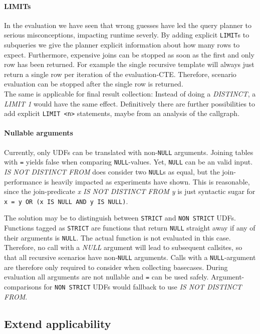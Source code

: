 \paragraph*{LIMITs}
In the evaluation we have seen that wrong guesses have led the query planner to serious misconceptions, impacting runtime severly. By adding explicit \texttt{LIMIT}s to subqueries we give the planner explicit information about how many rows to expect. Furthermore, expensive joins can be stopped as soon as the first and only row has been returned. For example the single recursive template will always just return a single row per iteration of the evaluation-CTE. Therefore, scenario evaluation can be stopped after the single row is returned.\\
The same is applicable for final result collection: Instead of doing a \textit{DISTINCT}, a \textit{LIMIT 1} would have the same effect. Definitively there are further possibilities to add explicit \texttt{LIMIT <n>} statements, maybe from an analysis of the callgraph.

\paragraph*{Nullable arguments}
Currently, only UDFs can be translated with non-\texttt{NULL} arguments. Joining tables with \texttt{=} yields false when comparing \texttt{NULL}-values. Yet, \texttt{NULL} can be an valid input. \textit{IS NOT DISTINCT FROM} does consider two \texttt{NULL}s as equal, but the join-performance is heavily impacted as experiments have shown. This is reasonable, since the join-predicate \textit{x IS NOT DISTINCT FROM y} is just syntactic sugar for \texttt{x = y OR (x IS NULL AND y IS NULL)}.

The solution may be to distinguish between \texttt{STRICT} and \texttt{NON STRICT} UDFs. Functions tagged as \texttt{STRICT} are functions that return \texttt{NULL} straight away if any of their arguments is \texttt{NULL}. The actual function is not evaluated in this case. Therefore, no call with a \textit{NULL} argument will lead to subsequent callsites, so that all recursive scenarios have non-\texttt{NULL} arguments. Calls with a \texttt{NULL}-argument are therefore only required to consider when collecting basecases. During evaluation all arguments are not nullable and \texttt{=} can be used safely. Argument-comparisons for \texttt{NON STRICT} UDFs would fallback to use \textit{IS NOT DISTINCT FROM}.

\subsection{Extend applicability}

